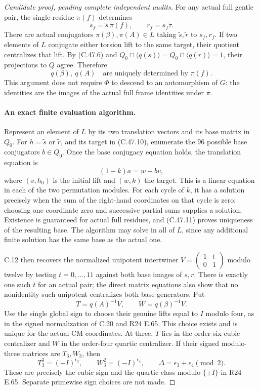 \begin{proof}[Candidate proof, pending complete independent audits]
For any actual full gentle pair, the single residue $\pi(f)$
determines
\[
 s_f=\widetilde s\,\pi(f),\qquad
 r_f=s_f\widetilde\tau.                              \tag{C.47.10}
\]
There are actual conjugators $\pi(\beta),\pi(A)\in L$ taking
$\widetilde s,\widetilde r$ to $s_f,r_f$. If two elements of
$L$ conjugate either torsion lift to the same target, their quotient
centralizes that lift. By (C.47.6) and
$Q_0\cap\langle q(s)\rangle=Q_0\cap\langle q(r)\rangle=1$,
their projections to $Q$ agree. Therefore
\[
                       q(\beta),\ q(A)
       \quad\text{are uniquely determined by }\pi(f).           \tag{C.47.11}
\]
This argument does not require $\Phi$ to descend to an automorphism
of $G$: the identities are the images of the actual full frame
identities under $\pi$.

\paragraph{An exact finite evaluation algorithm.}
Represent an element of $L$ by its two translation vectors and
its base matrix in $Q_0$. For $h=\widetilde s$ or
$\widetilde r$, and its target in (C.47.10), enumerate the
$96$ possible base conjugators $b\in Q_0$. Once the base
conjugacy equation holds, the translation equation is
\[
           (1-k)a=w-bv,                              \tag{C.47.12}
\]
where $(v,h_0)$ is the initial lift and $(w,k)$ the target.
This is a linear equation in each of the two permutation modules.
For each cycle of $k$, it has a solution precisely when the sum
of the right-hand coordinates on that cycle is zero; choosing one
coordinate zero and successive partial sums supplies a solution.
Existence is guaranteed for actual full residues, and (C.47.11)
proves uniqueness of the resulting base. The algorithm may solve
in all of $L$, since any additional finite solution has the same
base as the actual one.

C.12 then recovers the normalized unipotent intertwiner
$V=\left(\begin{smallmatrix}1&t\\0&1\end{smallmatrix}\right)$
modulo twelve by testing $t=0,\ldots,11$ against both base images
of $s,r$. There is exactly one such $t$ for an actual pair;
the direct matrix equations also show that no nonidentity such
unipotent centralizes both base generators. Put
\[
                      T=q(A)^{-1}V,\qquad
                      W=q(\beta)^{-1}V.             \tag{C.47.13}
\]
Use the single global sign to choose their genuine lifts equal
to $I$ modulo four, as in the signed normalization of C.20 and
R24 E.65. This choice exists and is unique for the actual CM
coordinates. At three, $T$ lies in the order-six cubic centralizer
and $W$ in the order-four quartic centralizer. If their signed
modulo-three matrices are $T_3,W_3$, then
\[
 T_3^3=(-I)^{\epsilon_3},\qquad
 W_3^2=(-I)^{\epsilon_4},\qquad
             \Delta=\epsilon_3+\epsilon_4\pmod2.     \tag{C.47.14}
\]
These are precisely the cubic sign and the quartic class modulo
$\{\pm I\}$ in R24 E.65. Separate primewise sign choices are
not made.


\end{proof}
